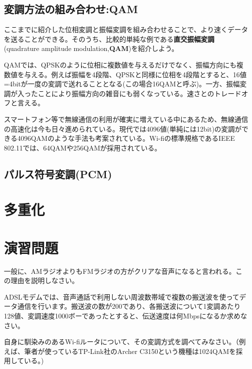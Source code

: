 \subsection{変調方法の組み合わせ:QAM}
ここまでに紹介した位相変調と振幅変調を組み合わせることで、より速くデータを送ることができる。そのうち、比較的単純な例である\textbf{直交振幅変調}(quadrature amplitude modulation,\textbf{QAM})を紹介しよう。

QAMでは、QPSKのように位相に複数値を与えるだけでなく、振幅方向にも複数値を与える。例えば振幅を4段階、QPSKと同様に位相を4段階とすると、16値=4bitが一度の変調で送れることとなる(この場合16QAMと呼ぶ)。一方、振幅変調が入ったことにより振幅方向の雑音にも弱くなっている。速さとのトレードオフと言える。

スマートフォン等で無線通信の利用が確実に増えている中にあるため、無線通信の高速化は今も日々進められている。現代では4096値(単純には12bit)の変調ができる4096QAMのような手法も考案されている。Wi-fiの標準規格であるIEEE 802.11では、64QAMや256QAMが採用されている。

\subsection{パルス符号変調(PCM)}


\section{多重化}


\section*{演習問題}
\begin{problems}
\item 一般に、AMラジオよりもFMラジオの方がクリアな音声になると言われる。この理由を説明しなさい。

\item ADSLモデムでは、音声通話で利用しない周波数帯域で複数の搬送波を使ってデータ通信を行います。搬送波の数が200であり、各搬送波について1変調あたり128値、変調速度1000ボーであったとすると、伝送速度は何Mbpsになるか求めなさい。

\item 自身に馴染みのあるWi-fiルータについて、その変調方式を調べてみなさい。（例えば、筆者が使っているTP-Link社のArcher C3150という機種は1024QAMを採用している。)
\end{problems}
